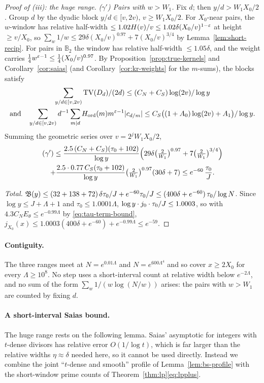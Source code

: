 \begin{proof}[Proof of (iii): the huge range]
\emph{($\gamma'$) Pairs with $w>W_1$.} Fix $d$; then $y/d>W_1X_0/2$. Group $d$ by the dyadic block $y/d\in[v,2v)$,
$v\ge W_1X_0/2$. For $X_0$-near pairs, the $w$-window has relative half-width $\le1.02H(v)/v\le1.02\delta(X_0/v)^{1-\varepsilon}$
at height $\ge v/X_0$, so $\sum_w1/w\le29\delta(X_0/v)^{0.97}+7(X_0/v)^{3/4}$ by Lemma~\ref{lem:short-recip}. For pairs in
$\mathbb B_2$ the window has relative half-width $\le1.05\delta$, and the weight carries
$\frac14w^{\varepsilon-1}\le\frac14(X_0/v)^{0.97}$. By Proposition~\ref{prop:true-kernels} and Corollary~\ref{cor:saias} (and
Corollary~\ref{cor:kr-weights} for the $m$-sums), the blocks satisfy
\begin{gather*}
  \sum_{y/d\in[v,2v)}\operatorname{TV}(D_d)/(2d)\le(C_N+C_S)\log(2v)/\log y\\
  \text{and}\quad\sum_{y/d\in[v,2v)}d^{-1}\sum_{m\mid d}H_{\mathrm{ord}}(m)m^{\varepsilon-1}|c_{d/m}|\le C_S\bigl((1+A_0)\log(2v)+A_1\bigr)/\log y.
\end{gather*}
Summing
the geometric series over $v=2^jW_1X_0/2$,
\begin{multline*}
  (\gamma')\le\frac{2.5\,(C_N+C_S)(\tau_0+102)}{\log y}\Bigl(29\delta\bigl(\tfrac2{W_1}\bigr)^{0.97}+7\bigl(\tfrac2{W_1}\bigr)^{3/4}\Bigr)\\
  +\frac{2.5\cdot0.77\,C_S(\tau_0+102)}{\log y}\bigl(\tfrac2{W_1}\bigr)^{0.97}(30\delta+7)\le e^{-60}\,\frac{\tau_0}J .
\end{multline*}

\emph{Total.} $\mathfrak{B}(y)\le(32+138+72)\,\delta\tau_0/J+e^{-60}\tau_0/J\le(400\delta+e^{-60})\,\tau_0/\log N$. Since
$\log y\le J+\Lambda+1$ and $\tau_0\le1.0001\Lambda$, $\log y\cdot j_0\cdot\tau_0/J\le1.0003$, so with
$4.3C_NE_\theta\le e^{-0.99\Lambda}$ by \eqref{eq:tau-term-bound}, $j_{X_0}(x)\le1.0003(400\delta+e^{-60})+e^{-0.99\Lambda}\le e^{-59}$.
\end{proof}

\paragraph{Contiguity.} The three ranges meet at $N=e^{0.01\Lambda}$ and $N=e^{600\Lambda^4}$ and so cover $x\ge2X_0$ for
every $\Lambda\ge10^8$. No step uses a short-interval count at relative width below $e^{-2\Lambda}$, and no sum of the form
$\sum_w1/(w\log(N/w))$ arises: the pairs with $w>W_1$ are counted by fixing $d$.

\paragraph{A short-interval Saias bound.} The huge range rests on the following lemma. Saias' asymptotic for integers with
$t$-dense divisors has relative error $O(1/\log t)$, which is far larger than the relative widths $\eta\approx\delta$ needed
here, so it cannot be used directly. Instead we combine the joint ``$t$-dense and smooth'' profile of
Lemma~\ref{lem:bs-profile} with the short-window prime counts of Theorem~\ref{thm:lp}\eqref{eq:lpplus}.

